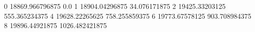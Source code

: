0 18869.966796875 0.0
1 18904.04296875 34.076171875
2 19425.33203125 555.365234375
4 19628.22265625 758.255859375
6 19773.67578125 903.708984375
8 19896.44921875 1026.482421875
